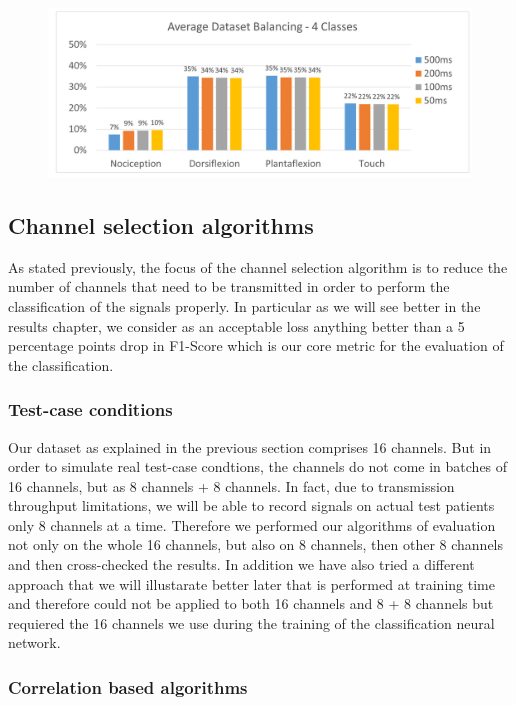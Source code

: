 \documentclass{Configuration_Files/PoliMi3i_thesis}
\begin{document}
\begin{figure}[H]
	\includegraphics[scale=0.4]{balanceClass.png}
	\centering
	\end{figure}
	

\subsection{Channel selection algorithms}

As stated previously, the focus of the channel selection algorithm is to reduce the number of channels that need to be transmitted in order to perform the classification of the signals properly.
In particular as we will see better in the results chapter, we consider as an acceptable loss anything better than a 5 percentage points drop in F1-Score which is our core metric for the evaluation of the classification.

\subsubsection{Test-case conditions}

Our dataset as explained in the previous section comprises 16 channels.
But in order to simulate real test-case condtions, the channels do not come in batches of 16 channels, but as 8 channels + 8 channels.
In fact, due to transmission throughput limitations, we will be able to record signals on actual test patients only 8 channels at a time.
Therefore we performed our algorithms of evaluation not only on the whole 16 channels, but also on 8 channels, then other 8 channels and then cross-checked the results.
In addition we have also tried a different approach that we will illustarate better later that is performed at training time and therefore could not be applied to both 16 channels and 8 + 8 channels but requiered the 16 channels we use during the training of the classification neural network.

\subsubsection{Correlation based algorithms}
\end{document}
